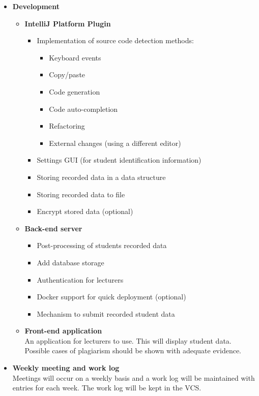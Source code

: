 \begin{itemize}
\begin{itemize}
  \end{itemize}
  \item \textbf{Development}
  \begin{itemize}
    \item \textbf{IntelliJ Platform Plugin}
    \begin{itemize}
      \item Implementation of source code detection methods:
      \begin{itemize}
        \item Keyboard events
        \item Copy/paste
        \item Code generation
        \item Code auto-completion
        \item Refactoring
        \item External changes (using a different editor)
      \end{itemize}
      \item Settings GUI (for student identification information)
      \item Storing recorded data in a data structure 
      \item Storing recorded data to file
      \item Encrypt stored data (optional)
    \end{itemize}
    \item \textbf{Back-end server}
    \begin{itemize}
      \item Post-processing of students recorded data
      \item Add database storage
      \item Authentication for lecturers
      \item Docker support for quick deployment (optional)
      \item Mechanism to submit recorded student data
    \end{itemize}
    \item \textbf{Front-end application}\\An application for lecturers to use. This will display student data. Possible cases of plagiarism should be shown with adequate evidence.
  \end{itemize}
  \item \textbf{Weekly meeting and work log}\\Meetings will occur on a weekly basis and a work log will be maintained with entries for each week. The work log will be kept in the VCS.

\end{itemize}
